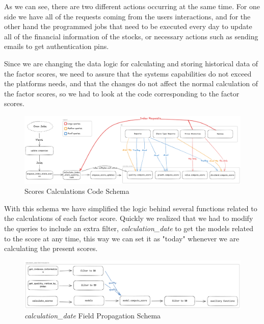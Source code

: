 \documentclass[11pt,english,a4paper,hidelinks]{book}
\begin{document}
\noindent As we can see, there are two different actions occurring at the same time. For one side we have all of the requests coming from the users interactions, and for the other hand the programmed jobs that need to be executed every day to update all of the financial information of the stocks, or necessary actions such as sending emails to get authentication pins.

\vspace{0.5cm}
\noindent Since we are changing the data logic for calculating and storing historical data of the factor scores, we need to assure that the systems capabilities do not exceed the platforms needs, and that the changes do not affect the normal calculation of the factor scores, so we had to look at the code corresponding to the factor scores.

\begin{figure}[H]
    \centering
    \includegraphics[width=1\textwidth]{images/tweenvest/scores schema.png}
    \caption{Scores Calculations Code Schema}
    \label{fig:scores_schema}
\end{figure}

\noindent With this schema we have simplified the logic behind several functions related to the calculations of each factor score. Quickly we realized that we had to modify the queries to include an extra filter, \textit{calculation\_date} to get the models related to the score at any time, this way we can set it as "today" whenever we are calculating the present scores.


\begin{figure}[H]
    \centering
    \includegraphics[width=1\textwidth]{images/tweenvest/Propagation Schema.png}
    \caption{\textit{calculation\_date} Field Propagation Schema}
    \label{fig:propagation_schema}
\end{figure}
\end{document}
